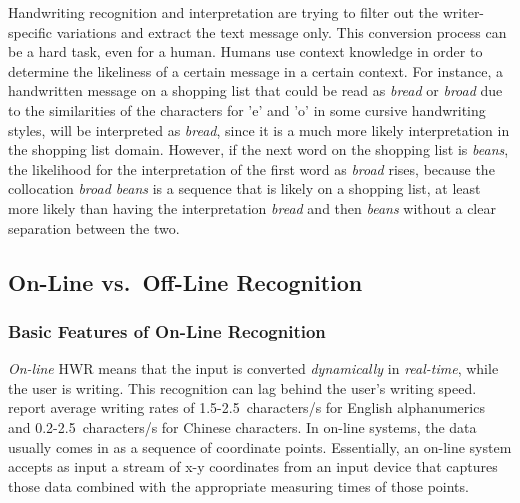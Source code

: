 Handwriting recognition and interpretation are trying to filter out the 
writer-specific variations and extract the text message only. This conversion
process can be a hard task, even for a human. Humans use context knowledge
in order to determine the likeliness of a certain message in a certain context.
For instance, a handwritten message on a shopping list that could be read
as \emph{bread} or \emph{broad} due to the similarities of the characters 
for 'e' and 'o' in some cursive handwriting styles, will be interpreted 
as \emph{bread}, since it is a much more likely interpretation in the 
shopping list domain. However, if the next word on the shopping list 
is \emph{beans}, the likelihood for the interpretation of the first word
as \emph{broad} rises, because the collocation \emph{broad beans} is a
sequence that is likely on a shopping list, at least more likely than
having the interpretation \emph{bread} and then \emph{beans} without a
clear separation between the two. 

\subsection{On-Line vs.\ Off-Line Recognition}
\label{sec:onlinevsoffline}


\subsubsection{Basic Features of On-Line Recognition}
\label{sec:basicfeaturesofonlinerecognition}

\emph{On-line} HWR means that the input is converted \emph{dynamically} in 
\emph{real-time}, while the user is writing. This recognition can lag behind
the user's writing speed. ~\citeyear{Tappert1990} 
report average writing rates of 1.5-2.5~characters/s for English alphanumerics 
and 0.2-2.5~characters/s for Chinese characters. In on-line systems, 
the data usually comes in as a sequence of coordinate points. 
Essentially, an on-line system accepts as input a stream of x-y coordinates 
from an input device that captures those data
combined with the appropriate measuring times of those points.

